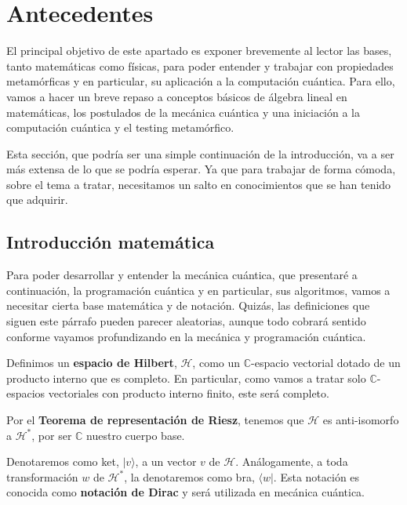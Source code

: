 \cleardoublepage

\chapter{Antecedentes}
\label{makereference}

El principal objetivo de este apartado es exponer brevemente al lector las bases, tanto matemáticas como físicas, para poder entender y trabajar con propiedades metamórficas y en particular, su aplicación a la computación cuántica. Para ello, vamos a hacer un breve repaso a conceptos básicos de álgebra lineal en matemáticas, los postulados de la mecánica cuántica y una iniciación a la computación cuántica y el testing metamórfico. 

\vspace{5pt}
Esta sección, que podría ser una simple continuación de la introducción, va a ser más extensa de lo que se podría esperar. Ya que para trabajar de forma cómoda, sobre el tema a tratar, necesitamos un salto en conocimientos que se han tenido que adquirir.

\section{Introducción matemática}
Para poder desarrollar y entender la mecánica cuántica, que presentaré a continuación, la programación cuántica y en particular, sus algoritmos, vamos a necesitar cierta base matemática y de notación. Quizás, las definiciones que siguen este párrafo pueden parecer aleatorias, aunque todo cobrará sentido conforme vayamos profundizando en la mecánica y programación cuántica.

\vspace{5pt}

Definimos un \textbf{espacio de Hilbert}, $\mathscr{H}$, como un $\mathbb{C}$-espacio vectorial dotado de un producto interno que es completo. En particular, como vamos a tratar solo $\mathbb{C}$-espacios vectoriales con producto interno finito, este será completo.

\vspace{5pt}

Por el \textbf{Teorema de representación de Riesz}, tenemos que $\mathscr{H}$ es anti-isomorfo a $\mathscr{H}^{*}$, por ser $\mathbb{C}$ nuestro cuerpo base.

\vspace{5pt}

Denotaremos como ket, $|v\rangle$, a un vector $v$ de $\mathscr{H}$. Análogamente, a toda transformación $w$ de $\mathscr{H}^{*}$, la denotaremos como bra, $\langle w|$. Esta notación es conocida como \textbf{notación de Dirac} y será utilizada en mecánica cuántica.

